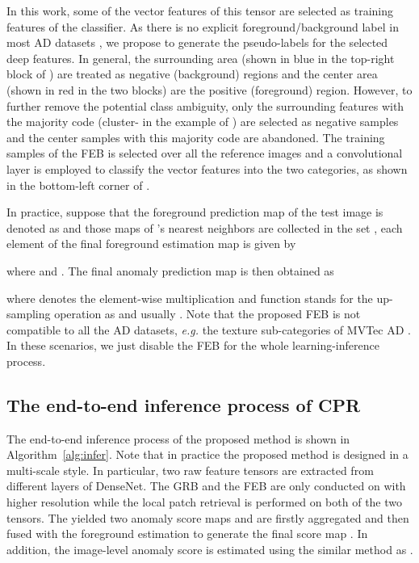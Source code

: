 \documentclass[lettersize,journal]{IEEEtran}
\begin{document}
In this work, some of the vector features  of this tensor are selected as training features of the classifier. As there is
no explicit foreground/background label in most AD datasets \cite{bergmann2019mvtec,
  Bergmann_2022}, we propose to generate the pseudo-labels for the selected deep features.
In general, the surrounding area (shown in blue in the top-right block of
) are treated as negative (background) regions and the center area
(shown in red in the two blocks) are the positive (foreground) region. However, to further
remove the potential class ambiguity, only the surrounding features with the majority code
(cluster- in the example of ) are selected as negative samples and
the center samples with this majority code are abandoned. The training samples of the
FEB is selected over all the reference images and a 
convolutional layer is employed to classify the vector features
 into the two categories, as shown in the
bottom-left corner of .

In practice, suppose that the foreground prediction map of the test image  is denoted as  and those maps
of 's  nearest neighbors are collected in the set , each element of the final foreground estimation map  is given by

where  and .
The final anomaly prediction map  is then
obtained as

where  denotes the element-wise multiplication and function
 stands for the up-sampling operation as  and usually .
Note that the proposed FEB is not compatible to all the AD datasets, \emph{e.g.} the
texture sub-categories of MVTec AD \cite{Bergmann_2019_CVPR}. In these scenarios, we just
disable the FEB for the whole learning-inference process.

\subsection{The end-to-end inference process of CPR}
\label{subsec:cpr_learn}
The end-to-end inference process of the proposed method is shown in
Algorithm~\ref{alg:infer}. Note that in practice the proposed method is designed in a
multi-scale style. In particular, two raw feature tensors 
are extracted from different layers of DenseNet. The GRB and the FEB are only
conducted on  with higher resolution while the local patch retrieval is
performed on both of the two tensors. The yielded two anomaly score maps
 and  are firstly aggregated and
then fused with the foreground estimation  to generate the final score
map .
In addition, the image-level anomaly score  is estimated using the similar
method as \cite{zhang2022prototypical, zhang2023destseg}.
\end{document}
